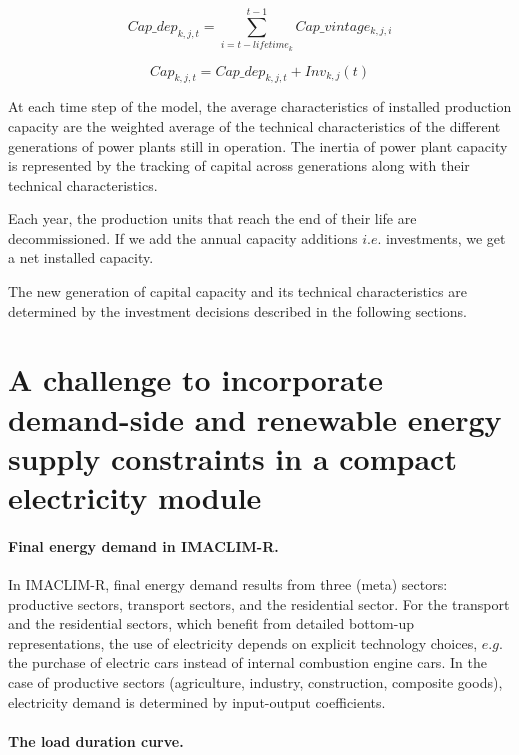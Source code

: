 \begin{dmath}
    Cap \_ dep_{k,j,t} = \sum_{i = t - lifetime_{k}}^{t-1}Cap\_vintage_{k,j,i}
    \label{eqn:Cap_elec_dep}
\end{dmath}

\begin{dmath}
    Cap_{k,j,t} = Cap\_dep_{k,j,t} + Inv_{k,j}(t)
    \label{eqn:Cap_elec}
\end{dmath}




At each time step of the model, the average characteristics of installed production capacity are the weighted average of the technical characteristics of the different generations of power plants still in operation.
The inertia of power plant capacity is represented by the tracking of capital across generations along with their technical characteristics.

Each year, the production units that reach the end of their life are decommissioned.
If we add the annual capacity additions $i.e.$ investments, we get a net installed capacity.

The new generation of capital capacity and its technical characteristics are determined by the investment decisions described in the following sections.
\section{A challenge to incorporate demand-side and renewable energy supply constraints in a compact electricity module}

\paragraph{Final energy demand in IMACLIM-R.}

In IMACLIM-R, final energy demand results from three (meta) sectors: productive sectors, transport sectors, and the residential sector. For the transport and the residential sectors, which benefit from detailed bottom-up representations, the use of electricity depends on explicit technology choices, $e.g.$ the purchase of electric cars instead of internal combustion engine cars. In the case of productive sectors (agriculture, industry, construction, composite goods), electricity demand is determined by input-output coefficients.

\paragraph{The load duration curve.}


